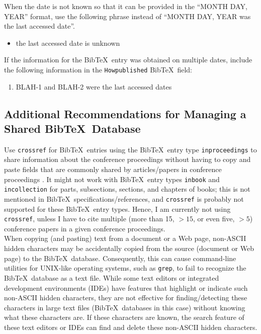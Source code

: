 \documentclass[letter,12pt]{article}
\begin{document}
When the date is not known so that it can be provided in the ``MONTH DAY, YEAR'' format, use the following phrase instead of ``MONTH DAY, YEAR was the last accessed date''. \vspace{-0.3cm}
\begin{itemize} \itemsep -4pt
\item the last accessed date is unknown
\end{itemize}


If the information for the {\sc Bib}\TeX\ entry was obtained on multiple dates, include the following information in the {\tt Howpublished} {\sc Bib}\TeX\ field: \vspace{-0.3cm}
\begin{enumerate} \itemsep -4pt
\item BLAH-1 and BLAH-2 were the last accessed dates
\end{enumerate}









\subsection{Additional Recommendations for Managing a Shared {\sc Bib}\TeX\ Database}
\label{ssec:AdditionalRecommendationsForManagingASharedBibTeXDatabase}



Use {\tt crossref} for {\sc Bib}\TeX\ entries using the {\sc Bib}\TeX\ entry type {\tt inproceedings} to share information about the conference proceedings without having to copy and paste fields that are commonly shared by articles/papers in conference proceedings \cite[\S12.2.3, pp. 234]{Kopka2004}. It might not work with {\sc Bib}\TeX\ entry types {\tt inbook} and {\tt incollection} for parts, subsections, sections, and chapters of books; this is not mentioned in {\sc Bib}\TeX\ specifications/references, and {\tt crossref} is probably not supported for these {\sc Bib}\TeX\ entry types. Hence, I am currently not using {\tt crossref}, unless I have to cite multiple (more than 15, $>15$, or even five, $>5$) conference papers in a given conference proceedings. \\



When copying (and pasting) text from a document or a Web page, non-ASCII hidden characters may be accidentally copied from the source (document or Web page) to the {\sc Bib}\TeX\ database. Consequently, this can cause command-line utilities for UNIX-like operating systems, such as {\tt grep}, to fail to recognize the {\sc Bib}\TeX\ database as a text file. While some text editors or integrated development environments (IDEs) have features that highlight or indicate such non-ASCII hidden characters, they are not effective for finding/detecting these characters in large text files ({\sc Bib}\TeX\ databases in this case) without knowing what these characters are. If these characters are known, the search feature of these text editors or IDEs can find and delete these non-ASCII hidden characters. \\
\end{document}

